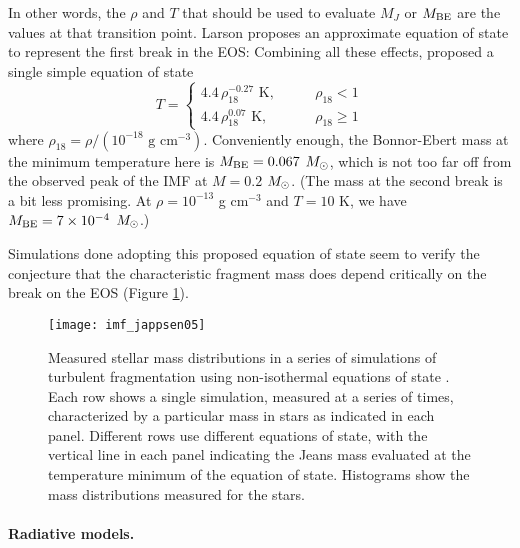 In other words, the $\rho$ and $T$ that should be used to evaluate $M_J$ or $M_{\rm BE}$ are the values at that transition point. Larson proposes an approximate equation of state to represent the first break in the EOS:
Combining all these effects, \citet{larson05a} proposed a single simple equation of state
\begin{equation}
T = \left\{
\begin{array}{ll}
4.4 \,\rho_{18}^{-0.27}\mbox{ K}, \qquad & \rho_{18} < 1 \\
4.4 \,\rho_{18}^{0.07}\mbox{ K}, & \rho_{18} \ge 1
\end{array}
\right.
\end{equation}
where $\rho_{18}=\rho/(10^{-18}\mbox{ g cm}^{-3})$. Conveniently enough, the Bonnor-Ebert mass at the minimum temperature here is $M_{\rm BE} = 0.067$ $M_{\odot}$, which is not too far off from the observed peak of the IMF at $M=0.2$ $M_{\odot}$. (The mass at the second break is a bit less promising. At $\rho = 10^{-13}$ g cm$^{-3}$ and $T=10$ K, we have $M_{\rm BE} = 7\times 10^{-4}$ $M_{\odot}$.)

Simulations done adopting this proposed equation of state seem to verify the conjecture that the characteristic fragment mass does depend critically on the break on the EOS (Figure \ref{fig:imf_jappsen05}).

\begin{figure}
\texttt{[image: imf\_jappsen05]}
\caption[IMF from simulations of non-isothermal fragmentation]{
\label{fig:imf_jappsen05}
Measured stellar mass distributions in a series of simulations of turbulent fragmentation using non-isothermal equations of state \citep{jappsen05a}. Each row shows a single simulation, measured at a series of times, characterized by a particular mass in stars as indicated in each panel. Different rows use different equations of state, with the vertical line in each panel indicating the Jeans mass evaluated at the temperature minimum of the equation of state. Histograms show the mass distributions measured for the stars.
}
\end{figure}

\paragraph{Radiative models.}

